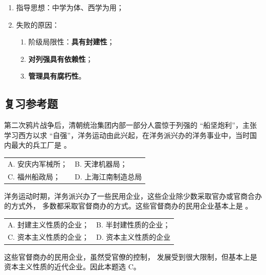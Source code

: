 \documentclass[10pt, UTF8]{book} %
\begin{document}
\begin{mdframed}[frametitle={洋务运动：一次封建统治阶级的自救运动}]
    \begin{enumerate}[label=\textup{\arabic*}${}^\circ$, itemsep=0pt]
        \item 指导思想：中学为体、西学为用；
        \item 失败的原因：
            \begin{enumerate}[itemsep=0pt]
                \item 阶级局限性：\textbf{具有封建性}；
                \item \textbf{对列强具有依赖性}；
                \item \textbf{管理具有腐朽性}。
            \end{enumerate}
    \end{enumerate}
\end{mdframed}

\subsection{复习参考题}

\begin{example}
    第二次鸦片战争后，清朝统治集团内部一部分人震惊于列强的 “船坚炮利”，主张学习西方以求
    “自强”，洋务运动由此兴起，在洋务派兴办的洋务事业中，当时国内最大的兵工厂是 
    \underline{\qquad \qquad \qquad}。
    \newline
    \begin{tabular}{p{} p{}}
    A. 安庆内军械所； & B. 天津机器局； \\
    C. 福州船政局； & D. 上海江南制造总局 
    \end{tabular}
\end{example}

\begin{example}[2018 年，第 10 题]
    洋务运动时期，洋务派兴办了一些民用企业，这些企业除少数采取官办或官商合办的方式外，
    多数都采取官督商办的方式。这些官督商办的民用企业基本上是 \underline{\qquad \qquad \qquad}。
    \begin{tabular}{p{} p{}}
    A. 封建主义性质的企业； & B. 半封建性质的企业；  \\
    C. 资本主义性质的企业； & D. 资本主义性质的企业 
    \end{tabular}
    \begin{sol}
        这些官督商办的民用企业，虽然受官僚的控制，
        发展受到很大限制，但基本上是资本主义性质的近代企业。因此本题选 C。
    \end{sol}
\end{example}
\end{document}

